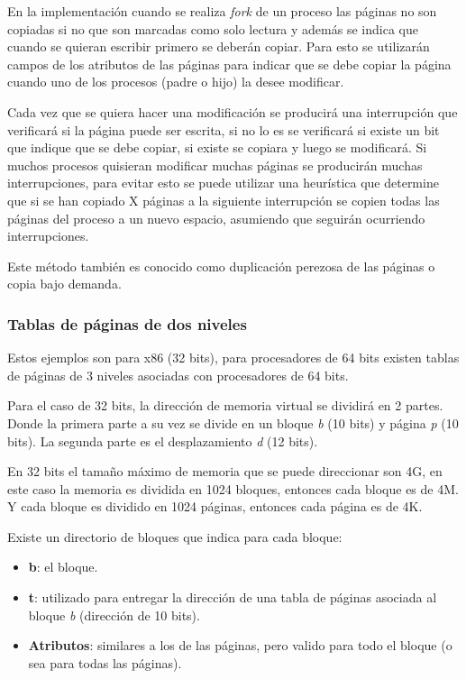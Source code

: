 En la implementación cuando se realiza \textit{fork} de un proceso las páginas
no son copiadas si no que son marcadas como solo lectura y además se indica que
cuando se quieran escribir primero se deberán copiar. Para esto se utilizarán
campos de los atributos de las páginas para indicar que se debe copiar la página
cuando uno de los procesos (padre o hijo) la desee modificar.

Cada vez que se quiera hacer una modificación se producirá una interrupción que
verificará si la página puede ser escrita, si no lo es se verificará si existe
un bit que indique que se debe copiar, si existe se copiara y luego se
modificará. Si muchos procesos quisieran modificar muchas páginas se producirán
muchas interrupciones, para evitar esto se puede utilizar una heurística que
determine que si se han copiado X páginas a la siguiente interrupción se copien
todas las páginas del proceso a un nuevo espacio, asumiendo que seguirán
ocurriendo interrupciones.

Este método también es conocido como duplicación perezosa de las páginas o copia
bajo demanda.

\subsubsection{Tablas de páginas de dos niveles}

Estos ejemplos son para x86 (32 bits), para procesadores de 64 bits existen
tablas de páginas de 3 niveles asociadas con procesadores de 64 bits.

Para el caso de 32 bits, la dirección de memoria virtual se dividirá en 2
partes. Donde la primera parte a su vez se divide en un bloque \textit{b} (10
bits) y página \textit{p} (10 bits). La segunda parte es el desplazamiento
\textit{d} (12 bits).

En 32 bits el tamaño máximo de memoria que se puede direccionar son 4G, en este
caso la memoria es dividida en 1024 bloques, entonces cada bloque es de 4M. Y
cada bloque es dividido en 1024 páginas, entonces cada página es de 4K.

Existe un directorio de bloques que indica para cada bloque:

\begin{itemize}
	\item \textbf{b}: el bloque.
	\item \textbf{t}: utilizado para entregar la dirección de una tabla de
páginas asociada al bloque \textit{b} (dirección de 10 bits).
	\item \textbf{Atributos}: similares a los de las páginas, pero valido
para todo el bloque (o sea para todas las páginas).
\end{itemize}

